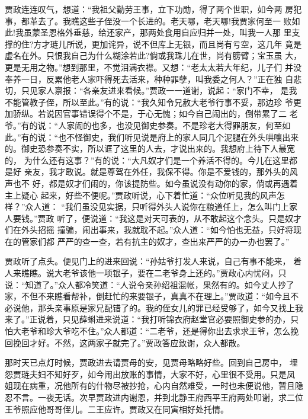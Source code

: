贾政连连叹气，想道：“我祖父勤劳王事，立下功勋，得了两个世职，如今两
房犯事，都革去了。我瞧这些子侄没一个长进的。老天哪，老天哪!我贾家何至一
败如此!我虽蒙圣恩格外垂慈，给还家产，那两处食用自应归并一处，叫我一人那
里支撑的住?方才琏儿所说，更加诧异，说不但库上无银，而且尚有亏空，这几年
竟是虚名在外。只恨我自己为什么糊涂若此?倘或我珠儿在世，尚有膀臂；宝玉虽
大，更是无用之物。”想到那里，不觉泪满衣襟。又想：“老太太若大年纪，儿子们
并没奉养一日，反累他老人家吓得死去活来，种种罪孽，叫我委之何人？”正在独
自悲切，只见家人禀报：“各亲友进来看候。”贾政一一道谢，说起：“家门不幸，
是我不能管教子侄，所以至此。”有的说：“我久知令兄赦大老爷行事不妥，那边珍
爷更加骄纵。若说因官事错误得个不是，于心无愧；如今自己闹出的，倒带累了二
老爷。”有的说：“人家闹的也多，也没见御史参奏。不是珍老大得罪朋友，何至如
此。”有的说：“也不怪御史，我们听见说是府上的家人同几个泥腿在外头哄嚷出来
的。御史恐参奏不实，所以诓了这里的人去，才说出来的。我想府上待下人最宽的，
为什么还有这事？”有的说：“大凡奴才们是一个养活不得的。今儿在这里都是好
亲友，我才敢说。就是尊驾在外任，我保不得。你是不爱钱的，那外头的风声也不
好，都是奴才们闹的，你该提防些。如今虽说没有动你的家，倘或再遇着主上疑心
起来，好些不便呢。”贾政听说，心下着忙道：“众位听见我的风声怎样？”众人道：
“我们虽没见实据，只听得外头人说你在粮道任上，怎么叫门上家人要钱。”贾政
听了，便说道：“我这是对天可表的，从不敢起这个念头。只是奴才们在外头招摇
撞骗，闹出事来，我就耽不起。”众人道：“如今怕也无益，只好将现在的管家们都
严严的查一查，若有抗主的奴才，查出来严严的办一办也罢了。”

贾政听了点头。便见门上的进来回说：“孙姑爷打发人来说，自己有事不能来，
着人来瞧瞧。说大老爷该他一项银子，要在二老爷身上还的。”贾政心内忧闷，只
说：“知道了。”众人都冷笑道：“人说令亲孙绍祖混帐，果然有的。如今丈人抄了
家，不但不来瞧看帮补，倒赶忙的来要银子，真真不在理上。”贾政道：“如今且不
必说他，那头亲事原是家兄配错了的。我的侄女儿的罪已经受够了，如今又找上我
来了。”正说着，只见薛蝌进来说道：“我打听锦衣府赵堂官必要照御史参的办，只
怕大老爷和珍大爷吃不住。”众人都道：“二老爷，还是得你出去求求王爷，怎么挽
回挽回才好。不然，这两家子就完了。”贾政答应致谢，众人都散。

那时天已点灯时候，贾政进去请贾母的安，见贾母略略好些。回到自己房中，
埋怨贾琏夫妇不知好歹，如今闹出放账的事情，大家不好，心里很不受用。只是凤
姐现在病重，况他所有的什物尽被抄抢，心内自然难受，一时也未便说他，暂且隐
忍不言。一夜无话。次早贾政进内谢恩，并到北静王府西平王府两处叩谢，求二位
王爷照应他哥哥侄儿。二王应许。贾政又在同寅相好处托情。


